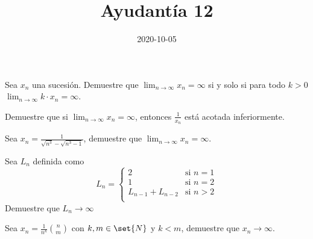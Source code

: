 \documentclass{ayudantia}
\title{Ayudantía 12}
\date{2020-10-05}
\begin{document}
\maketitle

\begin{prob}
    Sea \(x_n\) una sucesión. Demuestre que \(\lim_{n\rightarrow\infty}x_n=\infty\) si y solo si para todo \(k>0\) \(\lim_{n\rightarrow\infty}k\cdot x_n=\infty\).
\end{prob}

\begin{ans}
    \begin{sol}

\end{sol}
\end{ans}


\begin{prob}
    Demuestre que si \(\lim_{n\rightarrow\infty}x_n=\infty\), entonces \(\frac1{x_n}\) está acotada inferiormente.
\end{prob}

\begin{ans}
    \begin{sol}

\end{sol}
\end{ans}


\begin{prob}
    Sea \(x_n=\frac1{\sqrt{n^3}-\sqrt{n^3-1}}\), demuestre que \(\lim_{n\rightarrow\infty}x_n=\infty\).
\end{prob}

\begin{ans}
    \begin{sol}

\end{sol}
\end{ans}


\begin{prob}
    Sea \(L_n\) definida como
    \begin{equation*}
        L_n=\begin{cases}
            2 &\text{si }n=1\\
            1 &\text{si }n=2\\
            L_{n-1}+L_{n-2} &\text{si }n>2\\
        \end{cases}
    \end{equation*}
    Demuestre que \(L_n\rightarrow\infty\) 
\end{prob}

\begin{ans}
    \begin{sol}

\end{sol}
\end{ans}



\begin{prob}
    Sea \(x_n=\frac1{n^k}\binom{n}{m}\) con \(k,m\in\set{N}\) y \(k< m\), demuestre que \(x_n\rightarrow\infty\).
\end{prob}

\begin{ans}
    \begin{sol}

\end{sol}
\end{ans}
\end{document}
